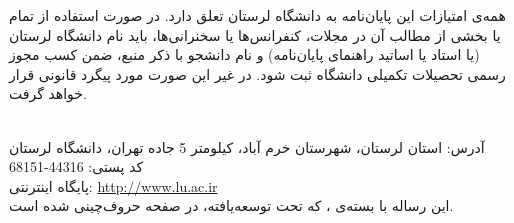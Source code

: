 \begin{titlepage}
\begin{LARGE}
همه‌ی امتیازات این پایان‌نامه به دانشگاه لرستان تعلق دارد. در صورت استفاده از تمام یا بخشی از مطالب آن در مجلات، کنفرانس‌ها یا سخنرانی‌ها، باید نام دانشگاه لرستان (یا استاد یا اساتید راهنمای پایان‌نامه) و نام دانشجو با ذکر منبع، ضمن کسب مجوز رسمی تحصیلات تکمیلی دانشگاه ثبت شود. در غیر این صورت مورد پیگرد قانونی قرار خواهد گرفت.
\end{LARGE}
\noindent
\vspace{10cm}

\hrulefill\\[1cm]
آدرس: استان لرستان، شهرستان خرم آباد، كيلومتر 5 جاده تهران، دانشگاه لرستان \\
کد پستی: 44316-68151\\
پایگاه اینترنتی: \url{http://www.lu.ac.ir}\\
این رساله با بسته‌ی
 \lr{\XePersian}، 
که تحت 
 \lr{\LaTeX} 
توسعه‌یافته، 
در
\pageref{LastPage}
 صفحه حروف‌چینی شده است.\\[1cm]
 
\hrulefill
\end{titlepage}